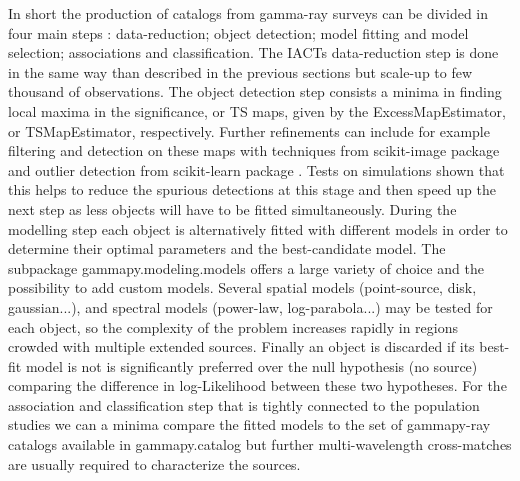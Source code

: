 In short the production of catalogs from gamma-ray surveys can be divided in four main steps : data-reduction; object detection; model fitting and model selection; associations and classification.
The IACTs data-reduction step is done in the same way than described in the previous sections but scale-up to few thousand of observations. The object detection step consists a minima in finding local maxima in the significance, or TS maps,  given by the ExcessMapEstimator, or TSMapEstimator, respectively.  Further refinements can include for example  filtering  and detection on these maps with techniques from scikit-image package  \citep{scikit-image} and outlier detection from scikit-learn package  \citep{scikit-learn} . Tests on simulations shown that this helps to reduce the spurious detections at this stage and then speed up the next step as less objects will have to be fitted simultaneously.
During the modelling step each object is alternatively fitted with different models in order to determine their optimal parameters and the best-candidate model. The subpackage gammapy.modeling.models offers a large variety of choice and the possibility to add custom models.  Several spatial models (point-source, disk, gaussian...), and spectral models (power-law, log-parabola...) may be tested for each object, so the complexity of the problem increases rapidly in regions crowded with multiple extended sources. Finally an object is discarded if its best-fit model is not is significantly preferred over the null hypothesis (no source) comparing the difference in log-Likelihood between these two hypotheses.
For the association and classification step that is tightly connected to the population studies we can a minima compare the fitted models to the set of gammapy-ray catalogs available in gammapy.catalog but further multi-wavelength cross-matches are usually required to characterize the sources. 

